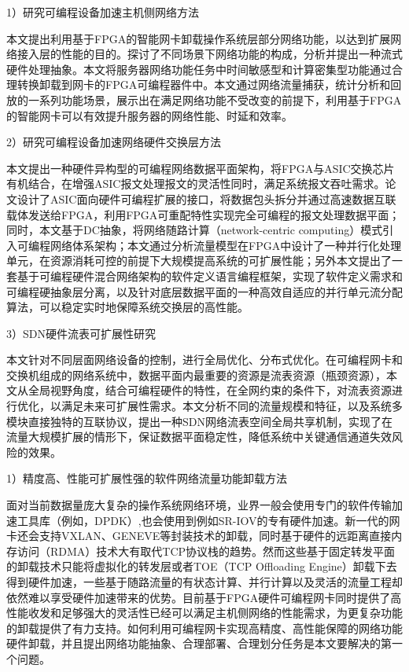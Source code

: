 1）研究可编程设备加速主机侧网络方法

本文提出利用基于FPGA的智能网卡卸载操作系统层部分网络功能，以达到扩展网络接入层的性能的目的。探讨了不同场景下网络功能的构成，分析并提出一种流式硬件处理抽象。本文将服务器网络功能任务中时间敏感型和计算密集型功能通过合理转换卸载到网卡的FPGA可编程器件中。本文通过网络流量捕获，统计分析和回放的一系列功能场景，展示出在满足网络功能不受改变的前提下，利用基于FPGA的智能网卡可以有效提升服务器的网络性能、时延和效率。

2）研究可编程设备加速网络硬件交换层方法

本文提出一种硬件异构型的可编程网络数据平面架构，将FPGA与ASIC交换芯片有机结合，在增强ASIC报文处理报文的灵活性同时，满足系统报文吞吐需求。论文设计了ASIC面向硬件可编程扩展的接口，将数据包头拆分并通过高速数据互联载体发送给FPGA，利用FPGA可重配特性实现完全可编程的报文处理数据平面；同时，本文基于DC抽象，将网络随路计算（network-centric computing）模式引入可编程网络体系架构；本文通过分析流量模型在FPGA中设计了一种并行化处理单元，在资源消耗可控的前提下大规模提高系统的可扩展性能；另外本文提出了一套基于可编程硬件混合网络架构的软件定义语言编程框架，实现了软件定义需求和可编程硬抽象层分离，以及针对底层数据平面的一种高效自适应的并行单元流分配算法，可以稳定实时地保障系统交换层的高性能。

3）SDN硬件流表可扩展性研究

本文针对不同层面网络设备的控制，进行全局优化、分布式优化。在可编程网卡和交换机组成的网络系统中，数据平面内最重要的资源是流表资源（瓶颈资源），本文从全局视野角度，结合可编程硬件的特性，在全网约束的条件下，对流表资源进行优化，以满足未来可扩展性需求。本文分析不同的流量规模和特征，以及系统多模块直接独特的互联协议，提出一种SDN网络流表空间全局共享机制，实现了在流量大规模扩展的情形下，保证数据平面稳定性，降低系统中关键通信通道失效风险的效果。


\label{chap13}

1）精度高、性能可扩展性强的软件网络流量功能卸载方法

面对当前数据量庞大复杂的操作系统网络环境，业界一般会使用专门的软件传输加速工具库（例如，DPDK）,也会使用到例如SR-IOV的专有硬件加速。新一代的网卡还会支持VXLAN、GENEVE等封装技术的卸载，同时基于硬件的远距离直接内存访问（RDMA）技术大有取代TCP协议栈的趋势。然而这些基于固定转发平面的卸载技术只能将虚拟化的转发层或者TOE（TCP Offloading Engine）卸载下去得到硬件加速，一些基于随路流量的有状态计算、并行计算以及灵活的流量工程却依然难以享受硬件加速带来的优势。目前基于FPGA硬件可编程网卡同时提供了高性能收发和足够强大的灵活性已经可以满足主机侧网络的性能需求，为更复杂功能的卸载提供了有力支持。如何利用可编程网卡实现高精度、高性能保障的网络功能硬件卸载，并且提出网络功能抽象、合理部署、合理划分任务是本文要解决的第一个问题。

